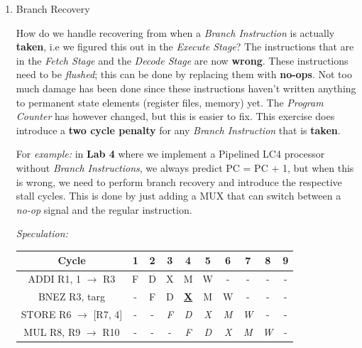 \documentclass[12pt]{article}
\newenvironment{QandA}{\begin{enumerate}[label=\bfseries\alph*.]\bfseries}
                      {\end{enumerate}}
\newenvironment{answered}{\par\quad\normalfont}{}
\begin{document}
\begin{QandA}
\begin{answered}
    \textbf{2. During Fetch:}
    
    \textit{How would this work?}
    
    Realistically, we don't really know anything about the instruction during the \textit{Fetch Stage}. But we will design mechanisms that will make this possible.
\end{answered}

\item Branch Recovery
\begin{answered}
    How do we handle recovering from when a \textit{Branch Instruction} is actually \textbf{taken}, i.e we figured this out in the \textit{Execute Stage}? The instructions that are in the \textit{Fetch Stage} and the \textit{Decode Stage} are now \textbf{wrong}. These instructions need to be \textit{flushed}; this can be done by replacing them with \textbf{no-ops}. Not too much damage has been done since these instructions haven't written anything to permanent state elements (register files, memory) yet. The \textit{Program Counter} has however changed, but this is easier to fix. This exercise does introduce a \textbf{two cycle penalty} for any \textit{Branch Instruction} that is \textbf{taken}. 
    
    For \textit{example:} in \textbf{Lab 4} where we implement a Pipelined LC4 processor without \textit{Branch Instructions}, we always predict PC = PC + 1, but when this is wrong, we need to perform branch recovery and introduce the respective stall cycles. This is done by just adding a MUX that can switch between a \textit{no-op} signal and the regular instruction. 
    
    \textit{Speculation:}
    
    \begin{center}
    \begin{tabular}{ |c|c|c|c|c|c|c|c|c|c| } 
     \hline
     Cycle & 1 & 2 & 3 & 4 & 5 & 6 & 7 & 8 & 9\\ 
     \hline
     ADDI R1, 1 $\rightarrow$ R3 & F & D & X & M & W & - & - & - & -\\ 
     BNEZ R3, targ & - & F & D & \textbf{\underline{X}} & M & W & - & - & - \\ 
     STORE R6 $\rightarrow$ [R7, 4] & - & - & \textit{F} & \textit{D} & \textit{X} & \textit{M} & \textit{W} & - & - \\ 
     MUL R8, R9 $\rightarrow$ R10 & - & - & - & \textit{F} & \textit{D} & \textit{X} & \textit{M} & \textit{W} & - \\ 
     \hline
    \end{tabular}
    \end{center}       
    

\end{answered}
\end{QandA}
\end{document}
